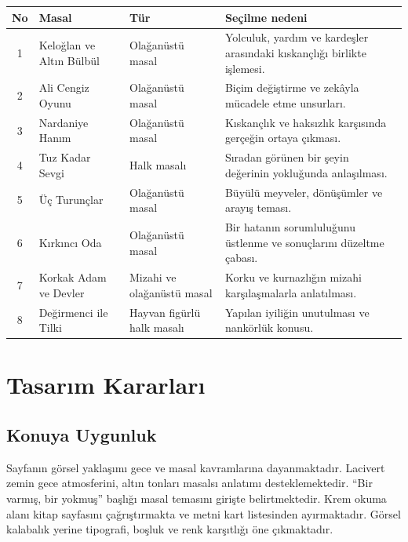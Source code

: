 \documentclass[12pt,a4paper]{article}
\begin{document}
\begin{longtable}{@{}cp{4cm}p{3cm}p{5.4cm}@{}}
\toprule
\textbf{No} & \textbf{Masal} & \textbf{Tür} & \textbf{Seçilme nedeni} \\
\midrule
\endhead
1 & Keloğlan ve Altın Bülbül & Olağanüstü masal & Yolculuk, yardım ve kardeşler arasındaki kıskançlığı birlikte işlemesi. \\[4pt]
2 & Ali Cengiz Oyunu & Olağanüstü masal & Biçim değiştirme ve zekâyla mücadele etme unsurları. \\[4pt]
3 & Nardaniye Hanım & Olağanüstü masal & Kıskançlık ve haksızlık karşısında gerçeğin ortaya çıkması. \\[4pt]
4 & Tuz Kadar Sevgi & Halk masalı & Sıradan görünen bir şeyin değerinin yokluğunda anlaşılması. \\[4pt]
5 & Üç Turunçlar & Olağanüstü masal & Büyülü meyveler, dönüşümler ve arayış teması. \\[4pt]
6 & Kırkıncı Oda & Olağanüstü masal & Bir hatanın sorumluluğunu üstlenme ve sonuçlarını düzeltme çabası. \\[4pt]
7 & Korkak Adam ve Devler & Mizahi ve olağanüstü masal & Korku ve kurnazlığın mizahi karşılaşmalarla anlatılması. \\[4pt]
8 & Değirmenci ile Tilki & Hayvan figürlü halk masalı & Yapılan iyiliğin unutulması ve nankörlük konusu. \\[4pt]
\bottomrule
\end{longtable}

\section{Tasarım Kararları}


\subsection{Konuya Uygunluk}
Sayfanın görsel yaklaşımı gece ve masal kavramlarına dayanmaktadır. Lacivert zemin gece atmosferini, altın tonları masalsı anlatımı desteklemektedir. “Bir varmış, bir yokmuş” başlığı masal temasını girişte belirtmektedir. Krem okuma alanı kitap sayfasını çağrıştırmakta ve metni kart listesinden ayırmaktadır. Görsel kalabalık yerine tipografi, boşluk ve renk karşıtlığı öne çıkmaktadır.
\end{document}
